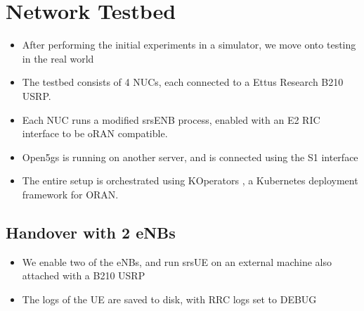 \section{Network Testbed}
\begin{itemize}
    \item After performing the initial experiments in a simulator, we move onto testing in the real world
    \item The testbed consists of 4 NUCs, each connected to a Ettus Research B210 USRP. 
    \item Each NUC runs a modified srsENB process, enabled with an E2 RIC interface to be oRAN compatible. 
    \item Open5gs is running on another server, and is connected using the S1 interface
    \item The entire setup is orchestrated using KOperators , a Kubernetes deployment framework for ORAN.
\end{itemize}

\subsection{Handover with 2 eNBs }
\begin{itemize}
    \item We enable two of the eNBs, and run srsUE on an external machine also attached with a B210 USRP
    \item The logs of the UE are saved to disk, with RRC logs set to DEBUG
\end{itemize}

